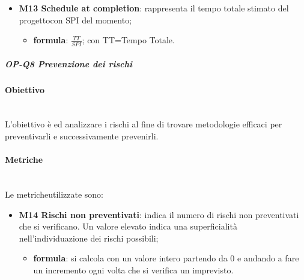 \begin{itemize}
			\item \textbf{M13 Schedule at completion}: rappresenta il tempo totale stimato del progetto\glosp con SPI del momento;
			\begin{itemize}
				\item[] \textbf{formula}: $\frac{TT}{SPI}$; con TT=Tempo Totale. 
			\end{itemize} 
		\end{itemize}
	
		\subparagraph{OP-Q8 Prevenzione dei rischi}
		\paragraph*{Obiettivo}\mbox{}\\ [1mm]
		L'obiettivo è ed analizzare i rischi al fine di trovare metodologie efficaci per preventivarli e successivamente prevenirli.
		\paragraph*{Metriche}\mbox{}\\ [1mm]
		Le metriche\glosp utilizzate sono:
		\begin{itemize}
			\item \textbf{M14 Rischi non preventivati}: indica il numero di rischi non preventivati che si verificano. Un valore elevato indica una superficialità nell'individuazione dei rischi possibili;
			\begin{itemize}
				\item[] \textbf{formula}: si calcola con un valore intero partendo da 0 e andando a fare un incremento ogni volta che si verifica un imprevisto.
			\end{itemize}
		\end{itemize}

